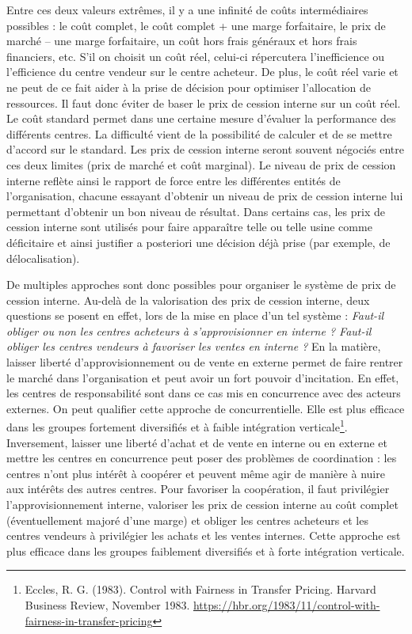 \documentclass[oneside]{kaobook}
\begin{document}
Entre ces deux valeurs extrêmes, il y a une infinité de coûts intermédiaires possibles : le coût complet, le coût complet + une marge forfaitaire, le prix de marché – une marge forfaitaire, un coût hors frais généraux et hors frais financiers, etc.
S’il on choisit un coût réel, celui-ci répercutera l’inefficience ou l’efficience du centre vendeur sur le centre acheteur. De plus, le coût réel varie et ne peut de ce fait aider à la prise de décision pour optimiser l’allocation de ressources. Il faut donc éviter de baser le prix de cession interne sur un coût réel.
Le coût standard permet dans une certaine mesure d’évaluer la performance des différents centres. La difficulté vient de la possibilité de calculer et de se mettre d’accord sur le standard.
Les prix de cession interne seront souvent négociés entre ces deux limites (prix de marché et coût marginal). Le niveau de prix de cession interne reflète ainsi le rapport de force entre les différentes entités de l’organisation, chacune essayant d’obtenir un niveau de prix de cession interne lui permettant d’obtenir un bon niveau de résultat. Dans certains cas, les prix de cession interne sont utilisés pour faire apparaître telle ou telle usine comme déficitaire et ainsi justifier a posteriori une décision déjà prise (par exemple, de délocalisation).

De multiples approches sont donc possibles pour organiser le système de prix de cession interne. Au-delà de la valorisation des prix de cession interne, deux questions se posent en effet, lors de la mise en place d’un tel système : \emph{Faut-il obliger ou non les centres acheteurs à s’approvisionner en interne ? Faut-il obliger les centres vendeurs à favoriser les ventes en interne ?}
En la matière, laisser liberté d’approvisionnement ou de vente en externe permet de faire rentrer le marché dans l’organisation et peut avoir un fort pouvoir d’incitation. En effet, les centres de responsabilité sont dans ce cas mis en concurrence avec des acteurs externes. On peut qualifier cette approche de concurrentielle. Elle est plus efficace dans les groupes fortement diversifiés et à faible intégration verticale\footnote{Eccles, R. G. (1983). Control with Fairness in Transfer Pricing. Harvard Business Review, November 1983. \url{https://hbr.org/1983/11/control-with-fairness-in-transfer-pricing}}.
Inversement, laisser une liberté d’achat et de vente en interne ou en externe et mettre les centres en concurrence peut poser des problèmes de coordination : les centres n’ont plus intérêt à coopérer et peuvent même agir de manière à nuire aux intérêts des autres centres. Pour favoriser la coopération, il faut privilégier l’approvisionnement interne, valoriser les prix de cession interne au coût complet (éventuellement majoré d'une marge) et obliger les centres acheteurs et les centres vendeurs à privilégier les achats et les ventes internes. Cette approche est plus efficace dans les groupes faiblement diversifiés et à forte intégration verticale.
\end{document}
